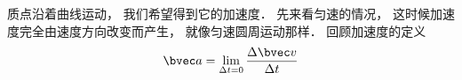 

质点沿着曲线运动， 我们希望得到它的加速度． 先来看匀速的情况， 这时候加速度完全由速度方向改变而产生， 就像匀速圆周运动那样． 回顾加速度的定义
\begin{equation}
\bvec a = \lim_{\Delta t = 0} \frac{\Delta \bvec v}{\Delta t}
\end{equation}




